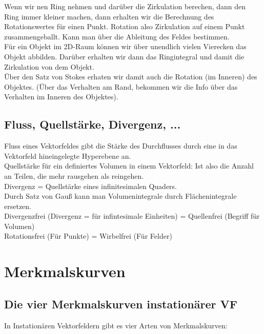\documentclass{article}
\begin{document}
\noindent  Wenn wir nen Ring nehmen und darüber die Zirkulation berechen, dann den Ring immer kleiner machen, dann erhalten wir die Berechnung des Rotationswertes für einen Punkt. Rotation also Zirkulation auf einem Punkt zusammengeballt. Kann man über die Ableitung des Feldes bestimmen.\\
 
\noindent  Für ein Objekt im 2D-Raum können wir über unendlich vielen Vierecken das Objekt abbilden. Darüber erhalten wir dann das Ringintegral und damit die Zirkulation von dem Objekt.\\
 Über den Satz von Stokes erhaten wir damit auch die Rotation (im Inneren) des Objektes. (Über das Verhalten am Rand, bekommen wir die Info über das Verhalten im Inneren des Objektes).\\


\subsection{Fluss, Quellstärke, Divergenz, ...}

Fluss eines Vektorfeldes gibt die Stärke des Durchflusses durch eine in das Vektorfeld hineingelegte Hyperebene an.\\

\noindent Quellstärke für ein definiertes Volumen in einem Vektorfeld: Ist also die Anzahl an Teilen, die mehr rausgehen als reingehen.\\

\noindent Divergenz	= Quellstärke eines infinitesimalen Quaders.\\

\noindent Durch Satz von Gauß kann man Volumenintegrale durch Flächenintegrale ersetzen.\\

\noindent Divergenzfrei (Divergenz = für infintesimale Einheiten) = Quellenfrei (Begriff für Volumen)\\
\noindent Rotationsfrei (Für Punkte) = Wirbelfrei (Für Felder) \\




\pagebreak
\section{Merkmalskurven}
\subsection{Die vier Merkmalskurven instationärer VF}
In Instationären Vektorfeldern gibt es vier Arten von Merkmalskurven:
\end{document}
